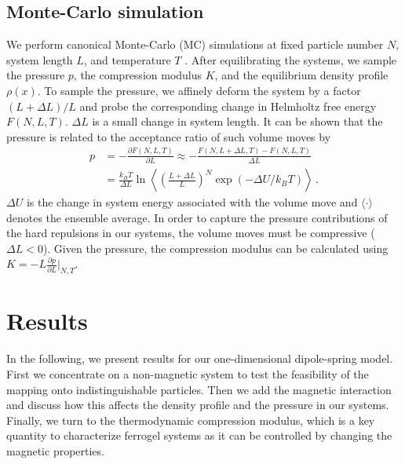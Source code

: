\documentclass[aps,pre,twocolumn,superscriptaddress,nofootinbib]{revtex4}
\begin{document}
\subsection{Monte-Carlo simulation}
We perform canonical Monte-Carlo (MC) simulations at fixed particle number $N$, system length $L$, and temperature $T$ \cite{Frenkel2001_book}.
After equilibrating the systems, we sample the pressure $p$, the compression modulus $K$, and the equilibrium density profile $\rho(x)$.
To sample the pressure, we affinely deform the system by a factor $(L + \Delta L)/L$ and probe the corresponding change in Helmholtz free energy $F(N,L,T)$. 
$\Delta L$ is a small change in system length.
It can be shown that the pressure is related to the acceptance ratio of such volume moves by \cite{Harismiadis1996_JChemPhys}
%
\begin{equation}
	\begin{aligned}
		p	&= -\frac{\partial F(N,L,T)}{\partial L} \approx -\frac{F(N,L + \Delta L,T) - F(N,L,T)}{\Delta L} \\ 
			&=  \frac{k_BT}{\Delta L} \ln\left\langle \left(\frac{L + \Delta L}{L}\right)^N \exp(-\Delta U / k_BT) \right\rangle \, .
	\end{aligned}
	\label{Eq.Widom_pressure}
\end{equation}
%
$\Delta U$ is the change in system energy associated with the volume move and $\langle \cdot \rangle$ denotes the ensemble average. 
In order to capture the pressure contributions of the hard repulsions in our systems, the volume moves must be compressive ($\Delta L < 0$).
Given the pressure, the compression modulus can be calculated using $K = -L \frac{\partial p}{\partial L}\big\vert_{N,T}$. 

\section{Results}
\label{Sec.Results}

In the following, we present results for our one-dimensional dipole-spring model.
First we concentrate on a non-magnetic system to test the feasibility of the mapping onto indistinguishable particles. 
Then we add the magnetic interaction and discuss how this affects the density profile and the pressure in our systems.
Finally, we turn to the thermodynamic compression modulus, which is a key quantity to characterize ferrogel systems as it can be controlled by changing the magnetic properties.

\end{document}

